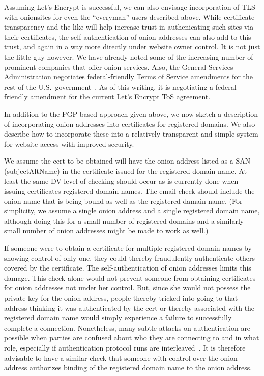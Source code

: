 \documentclass[10pt, conference, compsocconf]{styles/IEEEtran}
\begin{document}
Assuming Let's Encrypt is successful, we can also envisage
incorporation of TLS with onionsites for even the ``everyman'' users
described above.  While certificate transparency and the like will help
increase trust in authenicating such sites via their certificates,
the self-authentication of onion addresses can also add to this trust,
and again in a way more directly under website owner control.  It is
not just the little guy however. We have already noted some of the
increasing number of prominent companies that offer onion
services. Also, the General Services Administration negotiates
federal-friendly Terms of Service amendments for the rest of the U.S.\
government~\cite{gsa-tos}. As of this writing, it is negotiating a
federal-friendly amendment for the current Let's Encrypt ToS
agreement.

In addition to the PGP-based approach given above,
we now sketch a description of incorporating onion addresses into
certificates for registered domains. We also describe how to
incorporate these into a relatively transparent and simple system for
website access with improved security. 


We assume the cert to be obtained will have the onion address listed
as a SAN (subjectAltName) in the certificate issued for the registered
domain name.  At least the same DV level of checking should occur as
is currently done when issuing certificates registered domain
names. The email check should include the onion name that is being
bound as well as the registered damain name.  (For simplicity, we
assume a single onion address and a single registered domain name,
although doing this for a small number of registered domains and a
similarly small number of onion addresses might be made to work as
well.)


If someone were to obtain a certificate for multiple registered domain
names by showing control of only one, they could thereby fraudulently
authenticate others covered by the certificate. The
self-authentication of onion addresses limits this damage.  This check
alone would not prevent someone from obtaining certificates for onion
addresses not under her control. But, since she would not possess the
private key for the onion address, people thereby tricked into going
to that address thinking it was authenticated by the cert or thereby
associated with the registered domain name would simply experience a
failure to successfully complete a connection. Nonetheless, many
subtle attacks on authentication are possible when parties are
confused about who they are connecting to and in what role, especially
if authentication protocol runs are interleaved~\cite{fosad00}.  It is
therefore advisable to have a similar check that someone with control
over the onion address authorizes binding of the registered domain
name to the onion address.
\end{document}
